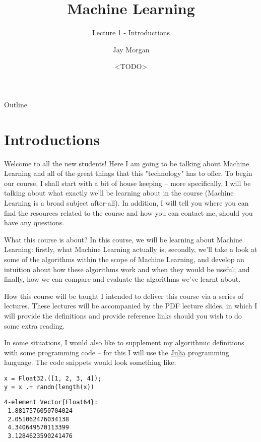 \documentclass[10pt]{beamer}
\author{Jay Morgan}
\date{<TODO>}
\title{Machine Learning}
\subtitle{Lecture 1 - Introductions}
\begin{document}
\maketitle
\begin{frame}{Outline}
\tableofcontents
\end{frame}


\section*{Introductions}
\label{sec:org025e022}

Welcome to all the new students! Here I am going to be talking about Machine Learning
and all of the great things that this "technology" has to offer. To begin our course,
I shall start with a bit of house keeping -- more specifically, I will be talking
about what exactly we'll be learning about in the course (Machine Learning is a broad
subject after-all). In addition, I will tell you where you can find the resources
related to the course and how you can contact me, should you have any questions.

\begin{frame}[label={sec:org5b47f76}]{What this course is about?}
In this course, we will be learning about Machine Learning: firstly, what Machine
Learning actually is; secondly, we'll take a look at some of the algorithms within
the scope of Machine Learning, and develop an intuition about how these algorithms
work and when they would be useful; and finally, how we can compare and evaluate the
algorithms we've learnt about.
\end{frame}

\begin{frame}[label={sec:org74e7c3d},fragile]{How this course will be taught}
 I intended to deliver this course via a series of lectures. These lectures will be
accompanied by the PDF lecture slides, in which I will provide the definitions and
provide reference links should you wish to do some extra reading.

In some situations, I would also like to supplement my algorithmic definitions with
some programming code -- for this I will use the \href{https://julialang.org/}{Julia} programming language. The code
snippets would look something like:

\begin{verbatim}
x = Float32.([1, 2, 3, 4]);
y = x .+ randn(length(x))
\end{verbatim}

\begin{verbatim}
4-element Vector{Float64}:
 1.8817576050704024
 2.051062476034138
 4.340649570113399
 3.1284623590241476
\end{verbatim}
\end{frame}
\end{document}
